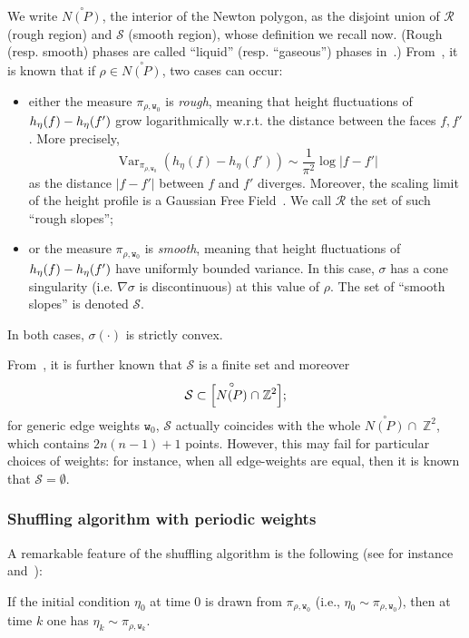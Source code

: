 \documentclass[AHL,Unicode,longabstracts,published]{cedram}
\newcommand{\ttw}{\mathtt{w}}
\newcommand{\bbZ}{\mathbb{Z}}
\newcommand{\clS}{\mathcal{S}}
\newcommand{\clR}{\mathcal{R}}
\DeclareMathOperator{\Var}{Var}
\newcommand{\ttw}{\mathtt{w}}
\begin{document}
We write $ \stackrel\circ{N(P)}$, the interior of the Newton polygon, as the disjoint union of $\clR$ (rough region) and $\clS$ (smooth region), whose definition we recall now. (Rough (resp. smooth) phases are called ``liquid'' (resp. ``gaseous'') phases in~\cite{KOS03}.)
From~\cite{KOS03}, it is known that if $\rho\in \stackrel\circ{N(P)}$, two cases can occur:
\begin{itemize}
\item either the measure $\pi_{\rho,\ttw_0}$ is \emph{rough}, meaning that height fluctuations of $h_\eta(f)\linebreak-h_{\eta}(f')$ grow logarithmically w.r.t. the distance between the faces $f,f'$. More precisely,
\begin{equation}
{\Var}_{\pi_{\rho,\ttw_0}}\left(h_\eta(f)-h_{\eta}(f')\right)\sim \frac1{\pi^2}\log \left|f-f'\right|
\end{equation}
as the distance $|f-f'|$ between $f$ and $f'$ diverges. Moreover, the scaling limit of the height profile is a Gaussian Free Field~\cite{KenLectures}. We call $\clR$ the set of such ``rough slopes'';
\item or the measure $\pi_{\rho,\ttw_0}$ is \emph{smooth}, meaning that height fluctuations of $h_\eta(f)\linebreak-h_{\eta}(f')$ have uniformly bounded variance. In this case, $\sigma$ has a cone singularity (i.e. $\nabla\sigma$ is discontinuous) at this value of $\rho$. The set of ``smooth slopes'' is denoted $\clS$.
\end{itemize}
{In both cases, $\sigma(\cdot)$ is strictly convex.}

From~\cite{KOS03}, it is further known that $\clS$ is a finite set and moreover
\begin{equation}\label{eq:rough}
\clS\subset \Bigl[\stackrel\circ{N(P)}\cap \;\bbZ^2\Bigr];
\end{equation}
for generic edge weights $\ttw_0$, $\clS$ actually coincides with the whole $\stackrel\circ{N(P)}\cap \;\bbZ^2$, which contains $2n(n-1)+1$ points. However, this may fail for particular choices of weights: for instance, when all edge-weights are equal, then it is known that $\clS=\emptyset$.



\subsubsection{Shuffling algorithm with periodic weights}

A remarkable feature of the shuffling algorithm is the following (see for instance \cite[Proposition~3.1]{CT:18} and~\cite[Proposition~2.2]{zhang2018domino}):
\begin{prop}\label{prop:misuramappata}
If the initial condition $\eta_0$ at time $0$ is drawn from $\pi_{\rho,\ttw_0}$ (i.e., $\eta_0\sim \pi_{\rho,\ttw_0}$), then at time $k$ one has $\eta_k\sim \pi_{\rho,\ttw_k}$.
\end{prop}
\end{document}
